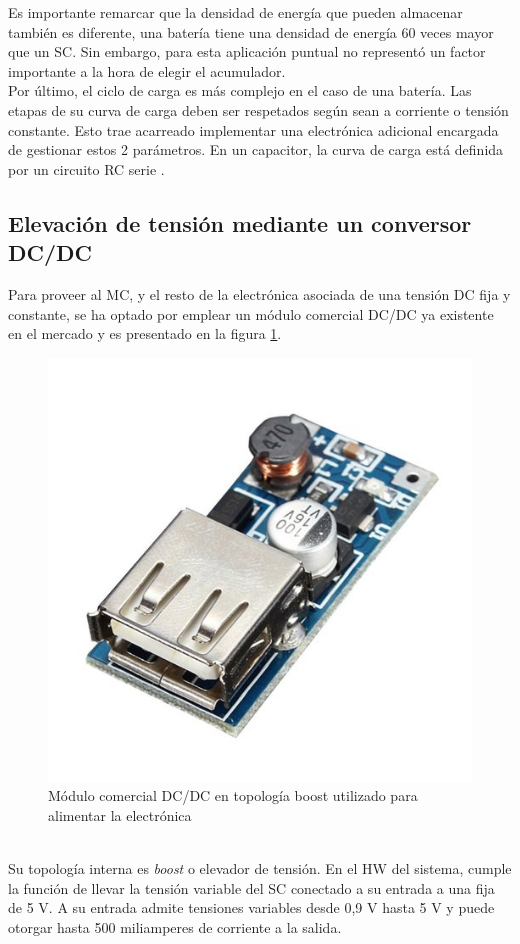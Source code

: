 Es importante remarcar que la densidad de energía que pueden almacenar también es diferente, una batería tiene una densidad de energía 60 veces mayor que un SC. Sin embargo, para esta aplicación puntual no representó un factor importante a la hora de elegir el acumulador.\\
Por último, el ciclo de carga es más complejo en el caso de una batería. Las etapas de su curva de carga deben ser respetados según sean a corriente o tensión constante. Esto trae acarreado implementar una electrónica adicional encargada de gestionar estos 2 parámetros. En un capacitor, la curva de carga está definida por un circuito RC serie \citep{ceraolo2014fundamentals}.\\ 

\subsection{Elevación de tensión mediante un conversor DC/DC }
Para proveer al MC, y el resto de la electrónica asociada de una tensión DC fija y constante, se ha optado por emplear un módulo comercial DC/DC ya existente en el mercado y es presentado en la figura \ref{fig:dcdcboost}.\\
\begin{figure}[h!]
	\centering
	\includegraphics[width=0.4\linewidth]{Figures/dcdc_boost}
	\caption{Módulo comercial DC/DC en topología boost utilizado para alimentar la electrónica}
	\label{fig:dcdcboost}
\end{figure}\\
Su topología interna es \textit{boost} o elevador de tensión. En el HW del sistema, cumple la función de llevar la tensión variable del SC conectado a su entrada a una fija de 5 V. 
A su entrada admite tensiones variables desde 0,9 V hasta 5 V y puede otorgar hasta 500 miliamperes de corriente a la salida.


